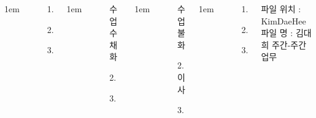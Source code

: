 \documentclass[25pt, a1paper ]{tikzposter}
\begin{document}
\begin{columns}
			{
					\setlength{\leftmargini}{4em}
					\setlength{\labelsep} {1em}
				\begin{LARGE}
					\begin{itemize}
					\item [1.] 
					\item [2.] 
					\item [3.] 
					\end{itemize}
				\end{LARGE}
			}





			{
					\setlength{\leftmargini}{4em}
					\setlength{\labelsep} {1em}
				\begin{LARGE}
					\begin{itemize}
					\item [수업] 수채화
					\item [2.] 
					\item [3.] 
					\end{itemize}
				\end{LARGE}
			}



			{
					\setlength{\leftmargini}{5em}
					\setlength{\labelsep} {1em}
				\begin{LARGE}
					\begin{itemize}
					\item [수업] 불화 
					\item [2.] 이사
					\item [3.] 
					\end{itemize}
				\end{LARGE}
			}


			{
					\setlength{\leftmargini}{4em}
					\setlength{\labelsep} {1em}
				\begin{LARGE}
					\begin{itemize}
					\item [1.] 
					\item [2.] 
					\item [3.] 
					\end{itemize}
				\end{LARGE}
파일 위치 :  KimDaeHee \\
파일 명 : 김대희 주간-주간업무
			}



	\end{columns}
\end{document}
